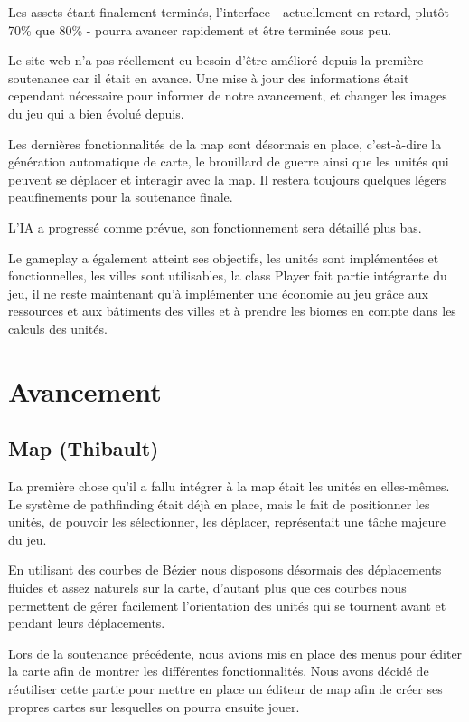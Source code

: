 \documentclass[12pt]{report}
\begin{document}
\vspace{0.5cm}

Les assets étant finalement terminés, l’interface - actuellement en retard,
plutôt 70\% que 80\% - pourra avancer rapidement et être terminée sous peu.

Le site web n’a pas réellement eu besoin d’être amélioré depuis la première
soutenance car il était en avance. Une mise à jour des informations était
cependant nécessaire pour informer de notre avancement, et changer les images du
jeu qui a bien évolué depuis.

Les dernières fonctionnalités de la map sont désormais en place, c'est-à-dire la
génération automatique de carte, le brouillard de guerre ainsi que les unités
qui peuvent se déplacer et interagir avec la map. Il restera toujours quelques
légers peaufinements pour la soutenance finale.

L’IA a progressé comme prévue, son fonctionnement sera détaillé plus bas.

Le gameplay a également atteint ses objectifs, les unités sont implémentées et
fonctionnelles, les villes sont utilisables, la class Player fait partie
intégrante du jeu, il ne reste maintenant qu’à implémenter une économie au jeu
grâce aux ressources et aux bâtiments des villes et à prendre les biomes en
compte dans les calculs des unités.

\chapter{Avancement}

\section{Map (Thibault)}

La première chose qu'il a fallu intégrer à la map était les unités en
elles-mêmes. Le système de pathfinding était déjà en place, mais le fait de
positionner les unités, de pouvoir les sélectionner, les déplacer, représentait
une tâche majeure du jeu. 

En utilisant des courbes de Bézier nous disposons désormais des déplacements
fluides et assez naturels sur la carte, d'autant plus que ces courbes nous
permettent de gérer facilement l'orientation des unités qui se tournent avant
et pendant leurs déplacements.

Lors de la soutenance précédente, nous avions mis en place des menus pour éditer
la carte afin de montrer les différentes fonctionnalités. Nous avons décidé de
réutiliser cette partie pour mettre en place un éditeur de map afin de créer ses
propres cartes sur lesquelles on pourra ensuite jouer.
\end{document}
